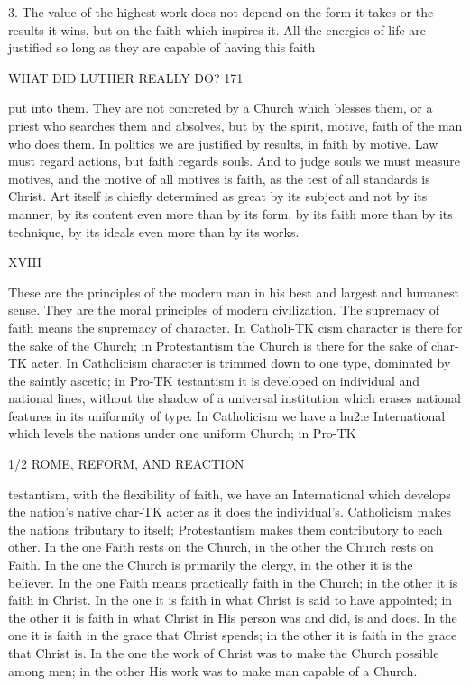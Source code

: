 \documentclass[12pt,a5paper,oneside]{book}
\begin{document}
{3. The value of the highest work does not depend 
on the form it takes or the results it wins, but on the 
faith which inspires it. All the energies of life are 
justified so long as they are capable of having this faith 



WHAT DID LUTHER REALLY DO? 171 

put into them. They are not concreted by a Church 
which blesses them, or a priest who searches them 
and absolves, but by the spirit, motive, faith of the 
man who does them. In politics we are justified by 
results, in faith by motive. Law must regard actions, 
but faith regards souls. And to judge souls we must 
measure motives, and the motive of all motives is faith, 
as the test of all standards is Christ. Art itself is 
chiefly determined as great by its subject and not by 
its manner, by its content even more than by its form, 
by its faith more than by its technique, by its ideals 
even more than by its works. 

XVIII 

These are the principles of the modern man in his 
best and largest and humanest sense. They are the 
moral principles of modern civilization. The supremacy 
of faith means the supremacy of character. In Catholi-TK
cism character is there for the sake of the Church; in 
Protestantism the Church is there for the sake of char-TK
acter. In Catholicism character is trimmed down to 
one type, dominated by the saintly ascetic; in Pro-TK
testantism it is developed on individual and national 
lines, without the shadow of a universal institution 
which erases national features in its uniformity of type. 
In Catholicism we have a hu2:e International which 
levels the nations under one uniform Church; in Pro-TK



1/2 ROME, REFORM, AND REACTION 

testantism, with the flexibility of faith, we have an 
International which develops the nation's native char-TK
acter as it does the individual's. Catholicism makes 
the nations tributary to itself; Protestantism makes 
them contributory to each other. In the one Faith 
rests on the Church, in the other the Church rests on 
Faith. In the one the Church is primarily the clergy, 
in the other it is the believer. In the one Faith means 
practically faith in the Church; in the other it is faith 
in Christ. In the one it is faith in what Christ is said 
to have appointed; in the other it is faith in what 
Christ in His person was and did, is and does. In the 
one it is faith in the grace that Christ spends; in the 
other it is faith in the grace that Christ is. In the one 
the work of Christ was to make the Church possible 
among men; in the other His work was to make man 
capable of a Church. 

}
\end{document}
